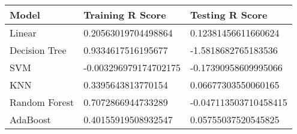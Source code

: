 \begin{tabularx}{\textwidth}{X X X}
  \toprule
  \textbf{Model} & \textbf{Training R Score} & \textbf{Testing R Score} \\
  \midrule
  Linear & 0.20563019704498864 & 0.12381456611660624 \\
  \midrule
  Decision Tree & 0.9334617516195677 & -1.5818682765183536 \\
  \midrule
  SVM & -0.003296979174702175 & -0.17390958609995066 \\
  \midrule
  KNN & 0.3395643813770154 & 0.06677303550060165 \\
  \midrule
  Random Forest & 0.7072866944733289 & -0.047113503710458415 \\
  \midrule
  AdaBoost  &0.40155919508932547 & 0.05755037520545825 \\
  \bottomrule
\end{tabularx}
